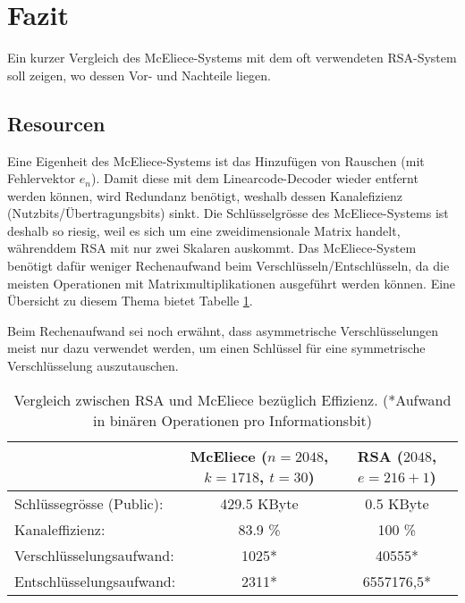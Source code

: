%
%
%
\section{Fazit
\label{mceliece:section:fazit}}
Ein kurzer Vergleich des McEliece-Systems
mit dem oft verwendeten RSA-System soll zeigen, wo dessen Vor- und Nachteile liegen.

\subsection{Resourcen}
Eine Eigenheit des McEliece-Systems ist das Hinzufügen von Rauschen (mit Fehlervektor $e_n$).
Damit diese mit dem Linearcode-Decoder wieder entfernt werden können,
wird Redundanz benötigt,
weshalb dessen Kanalefizienz (Nutzbits/Übertragungsbits) sinkt.
Die Schlüsselgrösse des McEliece-Systems ist deshalb so riesig, weil es sich um eine zweidimensionale Matrix handelt, währenddem RSA mit nur zwei Skalaren auskommt.
Das McEliece-System benötigt dafür weniger Rechenaufwand beim Verschlüsseln/Entschlüsseln,
da die meisten Operationen mit Matrixmultiplikationen ausgeführt werden können.
Eine Übersicht zu diesem Thema bietet Tabelle \ref{mceliece:tab:comparison_effort}.

Beim Rechenaufwand sei noch erwähnt,
dass asymmetrische Verschlüsselungen meist nur dazu verwendet werden,
um einen Schlüssel für eine symmetrische Verschlüsselung auszutauschen.
\begin{table}
    \begin{center}
        \begin{tabular}{l|c|c}
                                        &McEliece ($n=2048$, $k=1718$, $t = 30$)  &RSA ($2048$, $e = 216 + 1$)\\
            \hline
            Schlüssegrösse (Public):    &429.5 KByte                        &0.5 KByte              \\
            Kanaleffizienz:             &83.9 \%                            &100 \%                 \\
            Verschlüsselungsaufwand:    &1025*                               &40555*                  \\
            Entschlüsselungsaufwand:    &2311*                               &6557176,5*             \\
        \end{tabular}
    \end{center}
    \caption{\label{mceliece:tab:comparison_effort}Vergleich zwischen RSA und McEliece bezüglich Effizienz. (*Aufwand in binären Operationen pro Informationsbit\cite{mceliece:CodeBasedCrypto})}
\end{table}

